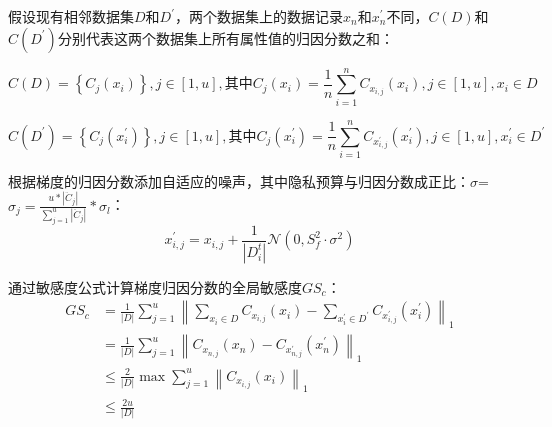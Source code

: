 假设现有相邻数据集$D$和$D^{\prime}$，两个数据集上的数据记录$x_{n}$和$x_{n}^{\prime}$不同，$C(D)$和$C(D^{\prime})$分别代表这两个数据集上所有属性值的归因分数之和：

\begin{equation}
C(D)=\left\{C_{j}\left(x_{i}\right)\right\}, j \in[1, u], \text {其中} C_{j}\left(x_{i}\right)=\frac{1}{n} \sum_{i=1}^{n} C_{x_{i, j}}\left(x_{i}\right), j \in[1, u], x_{i} \in D
\end{equation}

\begin{equation}
C\left(D^{\prime}\right)=\left\{C_{j}\left(x_{i}^{\prime}\right)\right\}, j \in[1, u], \text {其中} C_{j}\left(x_{i}^{\prime}\right)=\frac{1}{n} \sum_{i=1}^{n} C_{x_{i, j}^{\prime}}\left(x_{i}^{\prime}\right), j \in[1, u], x_{i}^{\prime} \in D^{\prime}
\end{equation}

根据梯度的归因分数添加自适应的噪声，其中隐私预算与归因分数成正比：$\sigma$=$\sigma_{j}=\frac{u *\left|\ddot{C}_{j}\right|}{\sum_{j=1}^{u}\left|\ddot{C}_{j}\right|} * \sigma_{l}$：
\begin{equation}\label{eq:神经网络加噪3}
x_{i, j}^{\prime}=x_{i, j}+\frac{1}{\left|D_{i}^{t}\right|}\mathcal{N}\left(0, S_{f}^{2} \cdot \sigma^{2}\right)
\end{equation}

通过敏感度公式计算梯度归因分数的全局敏感度$GS_{c}$：
\begin{equation}\label{eq:贡献敏感度}
\begin{aligned}
G S_{c} &=\frac{1}{|D|} \sum_{j=1}^{u}\left\|\sum_{x_{i} \in D} C_{x_{i, j}}\left(x_{i}\right)-\sum_{x_{i}^{\prime} \in D^{\prime}} C_{x_{i, j}^{\prime}}\left(x_{i}^{\prime}\right)\right\|_{1} \\
&=\frac{1}{|D|} \sum_{j=1}^{u}\left\|C_{x_{n, j}}\left(x_{n}\right)-C_{x_{n, j}^{\prime}}\left(x_{n}^{\prime}\right)\right\|_{1} \\
& \leq \frac{2}{|D|} \max \sum_{j=1}^{u}\left\|C_{x_{i, j}}\left(x_{i}\right)\right\|_{1} \\
& \leq \frac{2 u}{|D|}
\end{aligned}
\end{equation}

